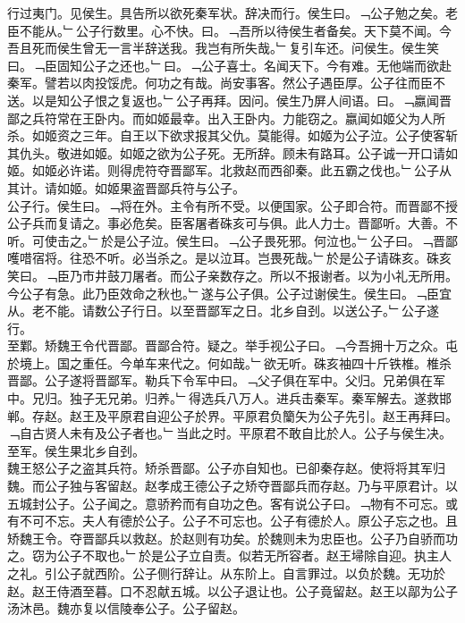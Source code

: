 \documentclass{zhvt-classic}
\begin{document}
\hspace*{2em}行过夷门。见侯生。具告所以欲死秦军状。辞决而行。侯生曰。﹁公子勉之矣。老臣不能从。﹂公子行数里。心不快。曰。﹁吾所以待侯生者备矣。天下莫不闻。今吾且死而侯生曾无一言半辞送我。我岂有所失哉。﹂复引车还。问侯生。侯生笑曰。﹁臣固知公子之还也。﹂曰。﹁公子喜士。名闻天下。今有难。无他端而欲赴秦军。譬若以肉投馁虎。何功之有哉。尚安事客。然公子遇臣厚。公子往而臣不送。以是知公子恨之复返也。﹂公子再拜。因问。侯生乃屏人间语。曰。﹁嬴闻晋鄙之兵符常在王卧内。而如姬最幸。出入王卧内。力能窃之。嬴闻如姬父为人所杀。如姬资之三年。自王以下欲求报其父仇。莫能得。如姬为公子泣。公子使客斩其仇头。敬进如姬。如姬之欲为公子死。无所辞。顾未有路耳。公子诚一开口请如姬。如姬必许诺。则得虎符夺晋鄙军。北救赵而西卻秦。此五霸之伐也。﹂公子从其计。请如姬。如姬果盗晋鄙兵符与公子。\\
\hspace*{2em}公子行。侯生曰。﹁将在外。主令有所不受。以便国家。公子即合符。而晋鄙不授公子兵而复请之。事必危矣。臣客屠者硃亥可与俱。此人力士。晋鄙听。大善。不听。可使击之。﹂於是公子泣。侯生曰。﹁公子畏死邪。何泣也。﹂公子曰。﹁晋鄙嚄唶宿将。往恐不听。必当杀之。是以泣耳。岂畏死哉。﹂於是公子请硃亥。硃亥笑曰。﹁臣乃市井鼓刀屠者。而公子亲数存之。所以不报谢者。以为小礼无所用。今公子有急。此乃臣效命之秋也。﹂遂与公子俱。公子过谢侯生。侯生曰。﹁臣宜从。老不能。请数公子行日。以至晋鄙军之日。北乡自刭。以送公子。﹂公子遂行。\\
\hspace*{2em}至鄴。矫魏王令代晋鄙。晋鄙合符。疑之。举手视公子曰。﹁今吾拥十万之众。屯於境上。国之重任。今单车来代之。何如哉。﹂欲无听。硃亥袖四十斤铁椎。椎杀晋鄙。公子遂将晋鄙军。勒兵下令军中曰。﹁父子俱在军中。父归。兄弟俱在军中。兄归。独子无兄弟。归养。﹂得选兵八万人。进兵击秦军。秦军解去。遂救邯郸。存赵。赵王及平原君自迎公子於界。平原君负籣矢为公子先引。赵王再拜曰。﹁自古贤人未有及公子者也。﹂当此之时。平原君不敢自比於人。公子与侯生决。至军。侯生果北乡自刭。\\
\hspace*{2em}魏王怒公子之盗其兵符。矫杀晋鄙。公子亦自知也。已卻秦存赵。使将将其军归魏。而公子独与客留赵。赵孝成王德公子之矫夺晋鄙兵而存赵。乃与平原君计。以五城封公子。公子闻之。意骄矜而有自功之色。客有说公子曰。﹁物有不可忘。或有不可不忘。夫人有德於公子。公子不可忘也。公子有德於人。原公子忘之也。且矫魏王令。夺晋鄙兵以救赵。於赵则有功矣。於魏则未为忠臣也。公子乃自骄而功之。窃为公子不取也。﹂於是公子立自责。似若无所容者。赵王埽除自迎。执主人之礼。引公子就西阶。公子侧行辞让。从东阶上。自言罪过。以负於魏。无功於赵。赵王侍酒至暮。口不忍献五城。以公子退让也。公子竟留赵。赵王以鄗为公子汤沐邑。魏亦复以信陵奉公子。公子留赵。\\
\end{document}
